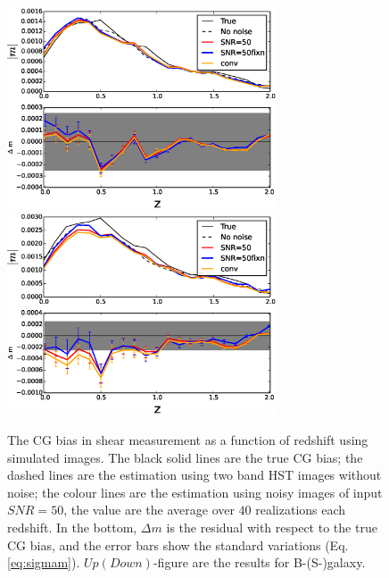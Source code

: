 \documentclass[useAMS,usenatbib]{mn2e}
\begin{document}
\begin{figure}
  \includegraphics[width=8.0cm]{zs2n_b_snrtt50.eps}
  \includegraphics[width=8.0cm]{zs2n_s_snrtt50.eps}
\caption{The CG bias in shear measurement as a function of redshift
  using simulated images. The black solid lines are the true CG bias;
  the dashed lines are the estimation using two band HST images
  without noise; the colour lines are the estimation using noisy
  images of input $SNR=50$, the value are the average over $40$
  realizations each redshift. In the bottom, $\Delta m$ is the
  residual with respect to the true CG bias, and the error bars show
  the standard variations (Eq.\ref{eq:sigmam}). $Up(Down)$-figure are
  the results for B-(S-)galaxy.}
\label{fig:biasofz50}
\end{figure}
\end{document}
